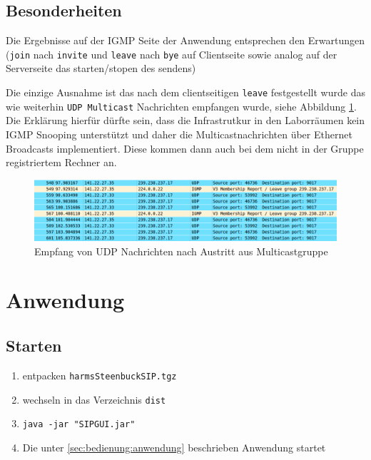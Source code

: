 \documentclass[10pt]{scrartcl}
\begin{document}
	
	\subsection{Besonderheiten}\label{subsec:besonderheiten}
	
	Die Ergebnisse auf der IGMP Seite der Anwendung entsprechen den Erwartungen (\verb!join! nach \verb!invite! und \verb!leave! nach \verb!bye! auf Clientseite sowie analog auf der Serverseite das starten/stopen des sendens)
	
	Die einzige Ausnahme ist das nach dem clientseitigen \verb!leave! festgestellt wurde das wie weiterhin \verb!UDP Multicast! Nachrichten empfangen wurde, siehe Abbildung \ref{img:cap1}. 
	Die Erklärung hierfür dürfte sein, dass die Infrastrutkur in den Laborräumen kein IGMP Snooping unterstützt und daher die Multicastnachrichten über Ethernet Broadcasts implementiert. Diese kommen dann auch bei dem nicht in der Gruppe registriertem Rechner an.
	
	
	\begin{figure}[htb]
        \centering
         \includegraphics[width=\textwidth]{img/udp_after_leaving}
         \caption{Empfang von UDP Nachrichten nach Austritt aus Multicastgruppe}
        \label{img:cap1}
	\end{figure}	



\section{Anwendung}

\subsection{Starten}
\begin{enumerate}
	\item entpacken \verb!harmsSteenbuckSIP.tgz!
	\item wechseln in das Verzeichnis \verb!dist!
	\item \verb!java -jar "SIPGUI.jar"!
	\item Die unter \ref{sec:bedienung:anwendung} beschrieben Anwendung startet
\end{enumerate}
\end{document}
